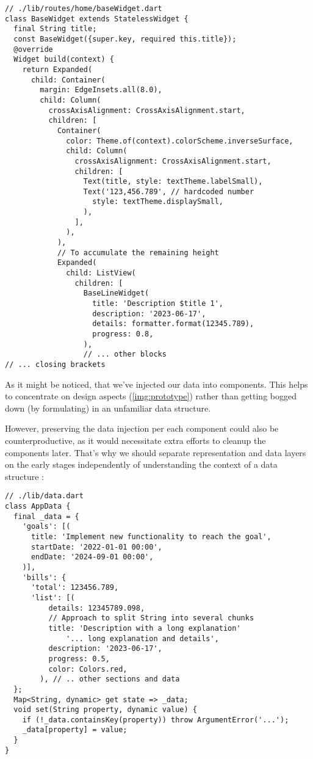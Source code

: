 \begin{lstlisting}
// ./lib/routes/home/baseWidget.dart
class BaseWidget extends StatelessWidget {
  final String title;
  const BaseWidget({super.key, required this.title});
  @override
  Widget build(context) {
    return Expanded(
      child: Container(
        margin: EdgeInsets.all(8.0),
        child: Column(
          crossAxisAlignment: CrossAxisAlignment.start,
          children: [
            Container(
              color: Theme.of(context).colorScheme.inverseSurface,
              child: Column(
                crossAxisAlignment: CrossAxisAlignment.start,
                children: [
                  Text(title, style: textTheme.labelSmall),
                  Text('123,456.789', // hardcoded number
                    style: textTheme.displaySmall,
                  ),
                ],
              ),
            ),
            // To accumulate the remaining height
            Expanded( 
              child: ListView(
                children: [
                  BaseLineWidget(
                    title: 'Description $title 1',
                    description: '2023-06-17',
                    details: formatter.format(12345.789),
                    progress: 0.8,
                  ),
                  // ... other blocks
// ... closing brackets
\end{lstlisting}

\noindent As it might be noticed, that we've injected our data into components. This helps to concentrate on design 
aspects (\cref{img:prototype}) rather than getting bogged down (by formulating) in an unfamiliar data structure. 

However, preserving the data injection per each component could also be counterproductive, as it would necessitate 
extra efforts to cleanup the components later. That's why we should separate representation and data layers on the 
early stages independently of understanding the context of a data structure :

\begin{lstlisting}[caption=Mock Structure of a Financial Data, label=code:app-data]
// ./lib/data.dart
class AppData {
  final _data = {
    'goals': [(
      title: 'Implement new functionality to reach the goal',
      startDate: '2022-01-01 00:00',
      endDate: '2024-09-01 00:00',
    )],
    'bills': {
      'total': 123456.789,
      'list': [(
          details: 12345789.098,
          // Approach to split String into several chunks
          title: 'Description with a long explanation'
              '... long explanation and details',
          description: '2023-06-17',
          progress: 0.5,
          color: Colors.red,
        ), // .. other sections and data
  };
  Map<String, dynamic> get state => _data;
  void set(String property, dynamic value) {
    if (!_data.containsKey(property)) throw ArgumentError('...');
    _data[property] = value;
  }
}
\end{lstlisting}

